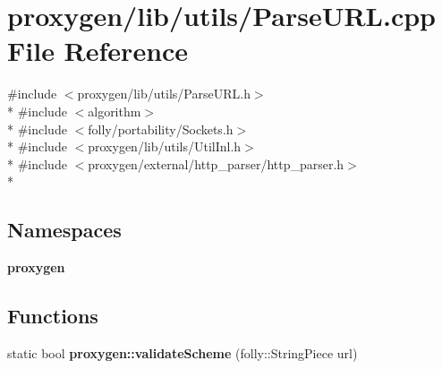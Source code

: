 \section{proxygen/lib/utils/\+Parse\+U\+RL.cpp File Reference}
\label{ParseURL_8cpp}
{\ttfamily \#include $<$proxygen/lib/utils/\+Parse\+U\+R\+L.\+h$>$}\\*
{\ttfamily \#include $<$algorithm$>$}\\*
{\ttfamily \#include $<$folly/portability/\+Sockets.\+h$>$}\\*
{\ttfamily \#include $<$proxygen/lib/utils/\+Util\+Inl.\+h$>$}\\*
{\ttfamily \#include $<$proxygen/external/http\+\_\+parser/http\+\_\+parser.\+h$>$}\\*
\subsection*{Namespaces}
\begin{DoxyCompactItemize}
\item 
 {\bf proxygen}
\end{DoxyCompactItemize}
\subsection*{Functions}
\begin{DoxyCompactItemize}
\item 
static bool {\bf proxygen\+::validate\+Scheme} (folly\+::\+String\+Piece url)
\end{DoxyCompactItemize}
